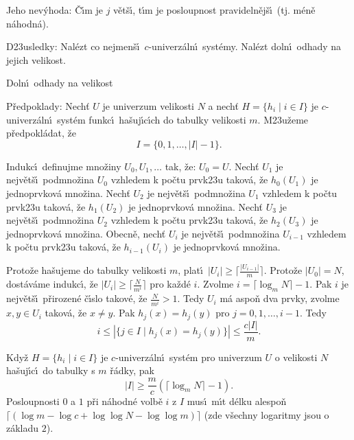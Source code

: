 \documentclass[a4paper,12pt]{article}
\begin{document}
\flushpar Jeho nev\'yhoda: \v C\'\i m je $j$ v\v et\v s\'\i , t\'\i m je 
posloupnost pravideln\v ej\v s\'\i\ (tj. m\'en\v e n\'ahodn\'a). 
\medskip

\flushpar D\accent23usledky: Nal\'ezt co nejmen\v s\'\i\ $c$-univerz\'aln\'\i\ 
syst\'emy. Nal\'ezt doln\'\i\ odhady na jejich velikost.
\medskip

\subhead
Doln\'\i\ odhady na velikost
\endsubhead
\smallskip

\flushpar P\v redpoklady: Nech\v t $U$ je univerzum velikosti $N$ a nech\v t 
$H=\{h_i\mid i\in I\}$ je $c$-univerz\'aln\'\i\ syst\'em funkc\'\i\ ha\v suj\'\i c\'\i ch do tabulky velikosti 
$m$. M\accent23u\v zeme p\v redpokl\'a\-dat, \v ze 
$$I=\{0,1,\dots,|I|-1\}.$$
\medskip

\flushpar Indukc\'\i\ definujme mno\v ziny $U_0,U_1,\dots$ tak, \v ze: 
$U_0=U$.\newline 
Nech\v t $U_1$ je nejv\v et\v s\'\i\ podmno\v zina $U_0$ vzhledem k po\v ctu 
prvk\accent23u takov\'a, \v ze $h_0(U_1)$ je jednoprvkov\'a 
mno\v zina. \newline 
Nech\v t $U_2$ je nejv\v et\v s\'\i\ podmno\v zina $U_1$ vzhledem k po\v ctu 
prvk\accent23u takov\'a, \v ze $h_1(U_2)$ je jednoprvkov\'a 
mno\v zina. \newline 
Nech\v t $U_3$ je nejv\v et\v s\'\i\ podmno\v zina $U_2$ vzhledem k po\v ctu 
prvk\accent23u takov\'a, \v ze $h_2(U_3)$ je jednoprvkov\'a 
mno\v zina. \newline 
Obecn\v e, nech\v t $U_i$ je nejv\v et\v s\'\i\ podmno\v zina $U_{
i-1}$ vzhledem k po\v ctu 
prvk\accent23u takov\'a, \v ze $h_{i-1}(U_i)$ je jednoprvkov\'a 
mno\v zina. 
\medskip

\flushpar Proto\v ze ha\v sujeme do tabulky velikosti $m$, plat\'\i\ 
$|U_i|\ge\lceil\frac {|U_{i-1}|}m\rceil$. Proto\v ze $|U_0|=N$, dost\'av\'ame indukc\'\i , \v ze 
$|U_i|\ge\lceil\frac N{m^i}\rceil$ pro ka\v zd\'e $i$. Zvolme $i=
\lceil\log_mN\rceil -1$. Pak $i$ je 
nejv\v et\v s\'\i\ p\v rirozen\'e \v c\'\i slo takov\'e, \v ze $\frac 
N{m^i}>1$. Tedy $U_i$ m\'a 
aspo\v n dva prvky, zvolme $x,y\in U_i$ takov\'a, \v ze $x\ne y$. Pak 
$h_j(x)=h_j(y)$ pro $j=0,1,\dots,i-1$. Tedy 
$$i\le |\{j\in I\mid h_j(x)=h_j(y)\}|\le\frac {c|I|}m.$$
\medskip

Kdy\v z $H=\{h_i\mid i\in I\}$ je $c$-univerz\'aln\'\i\ syst\'em pro 
univerzum $U$ o velikosti $N$ ha\v suj\'\i c\'\i\ do tabulky s $m$ \v r\'adky, pak 
$$|I|\ge\frac mc(\lceil\log_mN\rceil -1).$$
Posloupnosti $0$ a $1$ p\v ri n\'ahodn\'e volb\v e $i$ z $I$ mus\'\i\ m\'\i t 
d\'elku alespo\v n $\lceil (\log m-\log c+\log\log N-\log\log m)\rceil$ (zde v\v sechny logaritmy 
jsou o z\'akladu $2$).
\endproclaim
\medskip
\end{document}
